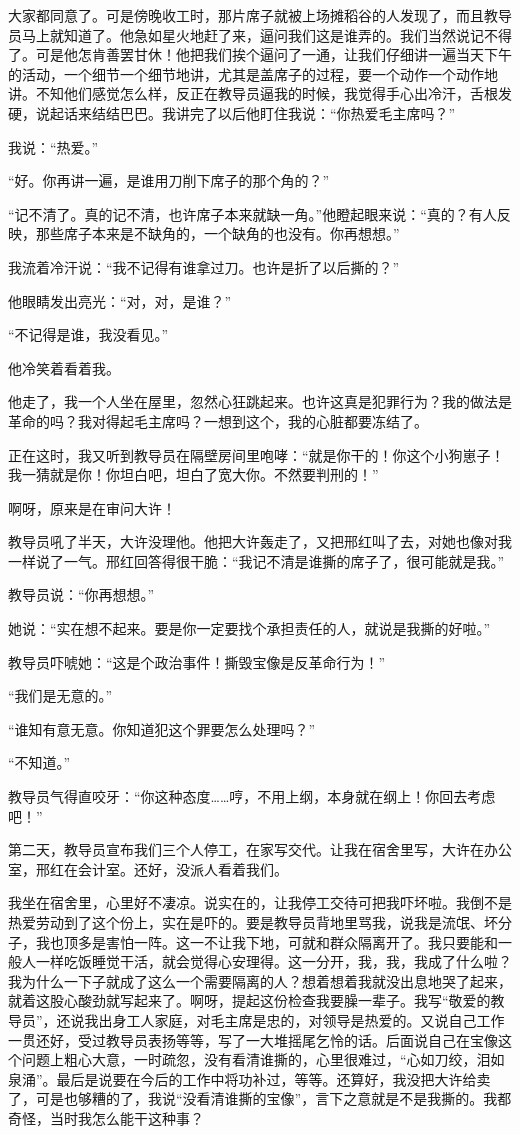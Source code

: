 大家都同意了。可是傍晚收工时，那片席子就被上场摊稻谷的人发现了，而且教导员马上就知道了。他急如星火地赶了来，逼问我们这是谁弄的。我们当然说记不得了。可是他怎肯善罢甘休！他把我们挨个逼问了一通，让我们仔细讲一遍当天下午的活动，一个细节一个细节地讲，尤其是盖席子的过程，要一个动作一个动作地讲。不知他们感觉怎么样，反正在教导员逼我的时候，我觉得手心出冷汗，舌根发硬，说起话来结结巴巴。我讲完了以后他盯住我说：“你热爱毛主席吗？” 

我说：“热爱。” 

“好。你再讲一遍，是谁用刀削下席子的那个角的？” 

“记不清了。真的记不清，也许席子本来就缺一角。”他瞪起眼来说：“真的？有人反映，那些席子本来是不缺角的，一个缺角的也没有。你再想想。” 

我流着冷汗说：“我不记得有谁拿过刀。也许是折了以后撕的？” 

他眼睛发出亮光：“对，对，是谁？” 

“不记得是谁，我没看见。” 

他冷笑着看着我。 

他走了，我一个人坐在屋里，忽然心狂跳起来。也许这真是犯罪行为？我的做法是革命的吗？我对得起毛主席吗？一想到这个，我的心脏都要冻结了。 

正在这时，我又听到教导员在隔壁房间里咆哮：“就是你干的！你这个小狗崽子！我一猜就是你！你坦白吧，坦白了宽大你。不然要判刑的！” 

啊呀，原来是在审问大许！ 

教导员吼了半天，大许没理他。他把大许轰走了，又把邢红叫了去，对她也像对我一样说了一气。邢红回答得很干脆：“我记不清是谁撕的席子了，很可能就是我。” 

教导员说：“你再想想。” 

她说：“实在想不起来。要是你一定要找个承担责任的人，就说是我撕的好啦。” 

教导员吓唬她：“这是个政治事件！撕毁宝像是反革命行为！” 

“我们是无意的。” 

“谁知有意无意。你知道犯这个罪要怎么处理吗？” 

“不知道。” 

教导员气得直咬牙：“你这种态度……哼，不用上纲，本身就在纲上！你回去考虑吧！” 

第二天，教导员宣布我们三个人停工，在家写交代。让我在宿舍里写，大许在办公室，邢红在会计室。还好，没派人看着我们。 

我坐在宿舍里，心里好不凄凉。说实在的，让我停工交待可把我吓坏啦。我倒不是热爱劳动到了这个份上，实在是吓的。要是教导员背地里骂我，说我是流氓、坏分子，我也顶多是害怕一阵。这一不让我下地，可就和群众隔离开了。我只要能和一般人一样吃饭睡觉干活，就会觉得心安理得。这一分开，我，我，我成了什么啦？我为什么一下子就成了这么一个需要隔离的人？想着想着我就没出息地哭了起来，就着这股心酸劲就写起来了。啊呀，提起这份检查我要臊一辈子。我写“敬爱的教导员”，还说我出身工人家庭，对毛主席是忠的，对领导是热爱的。又说自己工作一贯还好，受过教导员表扬等等，写了一大堆摇尾乞怜的话。后面说自己在宝像这个问题上粗心大意，一时疏忽，没有看清谁撕的，心里很难过，“心如刀绞，泪如泉涌”。最后是说要在今后的工作中将功补过，等等。还算好，我没把大许给卖了，可是也够糟的了，我说“没看清谁撕的宝像”，言下之意就是不是我撕的。我都奇怪，当时我怎么能干这种事？ 

